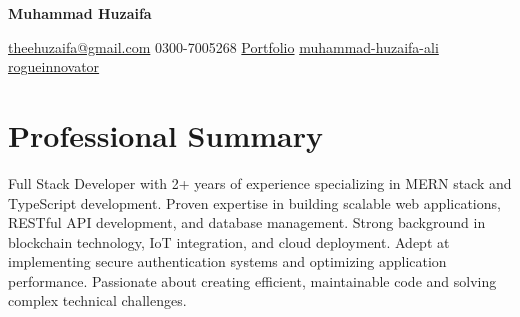 \documentclass[10pt, letterpaper]{article}
\newenvironment{header}{
    \setlength{\topsep}{0pt}\par\kern\topsep\centering\color{primaryColor}\linespread{1.5}
}{
    \par\kern\topsep
}
\let\hrefWithoutArrow\href
\renewcommand{\href}[2]{\hrefWithoutArrow{#1}{\ifthenelse{\equal{#2}{}}{ }{#2 }\raisebox{.15ex}{\footnotesize \faExternalLink*}}}
\begin{document}
\newcommand{\AND}{\unskip
	\cleaders\copy\ANDbox\hskip\wd\ANDbox
	\ignorespaces
}
\newsavebox\ANDbox
\sbox\ANDbox{}

\begin{header}
	\centering
	\fontsize{30pt}{30pt}\selectfont
	\textbf{Muhammad Huzaifa}

	\vspace{0.4cm}

	\normalsize
	\hrefWithoutArrow{mailto:theehuzaifa@gmail.com}{{\faEnvelope[regular]} \hspace{0.1cm} theehuzaifa@gmail.com} \quad
	{\faPhone*} \hspace{0.1cm} 0300-7005268 \quad
	\hrefWithoutArrow{https://portfolio-nine-fawn-23.vercel.app/}{{\faLink} \hspace{0.1cm} Portfolio} \quad
	\hrefWithoutArrow{https://www.linkedin.com/in/muhammad-huzaifa-ali-49aa94259/}{{\faLinkedinIn} \hspace{0.1cm} muhammad-huzaifa-ali} \quad
	\hrefWithoutArrow{https://github.com/rogueinnovator}{{\faGithub} \hspace{0.1cm} rogueinnovator}
\end{header}
\vspace{0.3cm}

\section{Professional Summary}
Full Stack Developer with 2+ years of experience specializing in MERN stack and TypeScript development. Proven expertise in building scalable web applications, RESTful API development, and database management. Strong background in blockchain technology, IoT integration, and cloud deployment. Adept at implementing secure authentication systems and optimizing application performance. Passionate about creating efficient, maintainable code and solving complex technical challenges.
\end{document}
